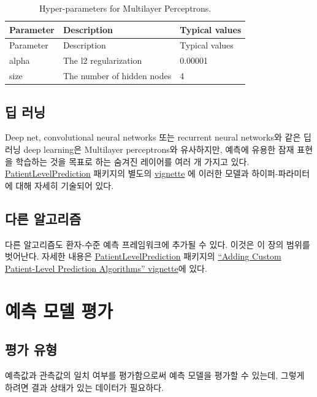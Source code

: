 \documentclass[10.5pt]{book}
\theoremstyle{definition}
\theoremstyle{definition}
\theoremstyle{definition}
\theoremstyle{remark}
\begin{document}
\begin{longtable}[]{@{}lll@{}}
\caption{\label{tab:mpParameters} Hyper-parameters for Multilayer
Perceptrons.}\tabularnewline
\toprule
Parameter & Description & Typical values\tabularnewline
\midrule
\endfirsthead
\toprule
Parameter & Description & Typical values\tabularnewline
\midrule
\endhead
alpha & The l2 regularization & 0.00001\tabularnewline
size & The number of hidden nodes & 4\tabularnewline
\bottomrule
\end{longtable}

\subsection{딥 러닝}\label{-}

Deep net, convolutional neural networks 또는 recurrent neural networks와
같은 딥 러닝 deep learning은 Multilayer perceptrons와 유사하지만, 예측에
유용한 잠재 표현을 학습하는 것을 목표로 하는 숨겨진 레이어를 여러 개
가지고 있다.
\href{https://ohdsi.github.io/PatientLevelPrediction/}{PatientLevelPrediction}
패키지의 별도의
\href{https://ohdsi.github.io/PatientLevelPrediction/articles/BuildingDeepLearningModels.html}{vignette}
에 이러한 모델과 하이퍼-파라미터에 대해 자세히 기술되어
있다. 

\subsection{다른 알고리즘}\label{-}

다른 알고리즘도 환자-수준 예측 프레임워크에 추가될 수 있다. 이것은 이
장의 범위를 벗어난다. 자세한 내용은
\href{https://ohdsi.github.io/PatientLevelPrediction/}{PatientLevelPrediction}
패키지의
\href{https://ohdsi.github.io/PatientLevelPrediction/articles/AddingCustomAlgorithms.html}{``Adding
Custom Patient-Level Prediction Algorithms'' vignette}에 있다.

\section{예측 모델 평가}\label{--}

\subsection{평가 유형}\label{-}

예측값과 관측값의 일치 여부를 평가함으로써 예측 모델을 평가할 수 있는데,
그렇게 하려면 결과 상태가 있는 데이터가 필요하다.
\end{document}
